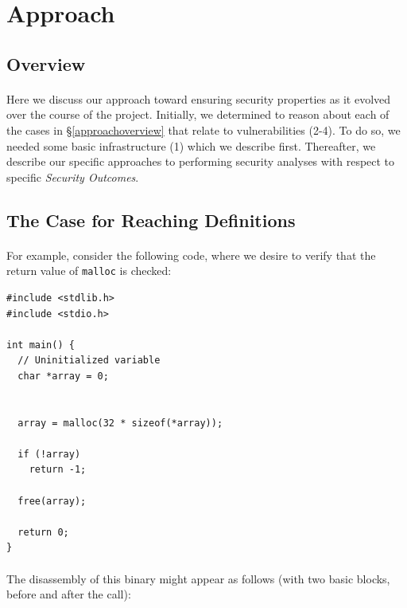 \documentclass[letterpaper,11pt]{article}
\begin{document}
\section{Approach}

\subsection{Overview}
\paragraph{}
Here we discuss our approach toward ensuring security properties as it evolved
over the course of the project. Initially, we determined to reason about each
of the cases in \S\ref{approachoverview} that relate to vulnerabilities
(2-4). To do so, we needed some basic infrastructure (1) which we describe
first. Thereafter, we describe our specific approaches to performing
security analyses with respect to specific \emph{Security Outcomes}.

\subsection{The Case for Reaching Definitions}

\paragraph{}
For example, consider the following code, where we desire to verify
that the return value of \texttt{malloc} is checked:

\begin{center}
\lstset{language=C, label=malloccheck,
caption=malloc.c, breaklines=true, basicstyle=\tiny, numbers=left}
\begin{lstlisting}
#include <stdlib.h>
#include <stdio.h>

int main() {
  // Uninitialized variable
  char *array = 0;


  array = malloc(32 * sizeof(*array));

  if (!array)
    return -1;

  free(array);

  return 0;
}
\end{lstlisting}
\end{center}

\paragraph{}
The disassembly of this binary might appear as follows (with two basic blocks,
before and after the call):
\end{document}
